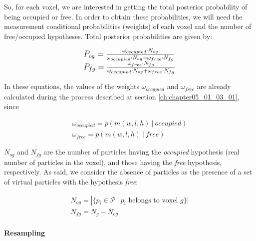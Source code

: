 So, for each voxel, we are interested in getting the total posterior probability of being occupied or free. In order to obtain these probabilities, we will need the measurement conditional probabilities (weights) of each voxel and the number of free/occupied hypotheses. Total posterior probabilities are given by:

\begin{equation}\label{eq:cp05_total_posterior_probabilities}
\large
\begin{array}{l}
P_{og}={{\omega_{occupied} \cdot N_{og}} \over {\omega_{occupied} \cdot N_{og} + \omega_{free} \cdot N_{fg}}} \\
P_{fg}={{\omega_{free} \cdot N_{fg}} \over {\omega_{occupied} \cdot N_{og} + \omega_{free} \cdot N_{fg}}}
\end{array}
\end{equation}

In these equations, the values of the weights $\omega_{occupied}$ and $\omega_{free}$ are already calculated during the process described at section \ref{ch:chapter05_01_03_01}, since 

\begin{equation}\label{eq:cp05_occupancy_weights}
\begin{array}{l}
\omega_{occupied} = p(m(w,l,h)~|~occupied) \\
\omega_{free} = p(m(w,l,h)~|~free)
\end{array}
\end{equation}

$N_{og}$ and $N_{fg}$ are the number of particles having the \emph{occupied} hypothesis (real number of particles in the voxel), and those having the \emph{free} hypothesis, respectively. As said, we consider the absence of particles as the presence of a set of virtual particles with the hypothesis \emph{free}:

\begin{equation}\label{eq:cp05_number_of_particles}
\begin{array}{l}
N_{og} = | \{ p_i \in \mathcal{P} ~|~ p_i \text{ belongs to voxel } g \} | \\
N_{fg} = N_g - N_{og}
\end{array}
\end{equation}

\FloatBarrier

\paragraph{Resampling}\label{ch:chapter05_01_04_02_03}

